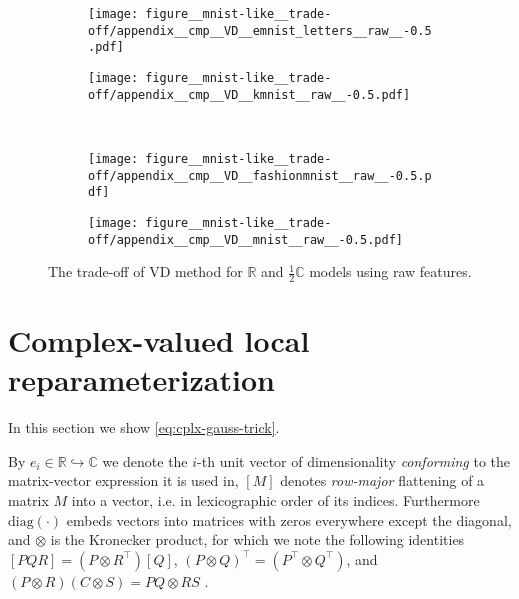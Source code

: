 \documentclass{article}
\newcommand{\real}{\mathbb{R}}
\newcommand{\cplx}{\mathbb{C}}
\newcommand{\diag}[1]{\mathrm{diag}{#1}}
\begin{document}
\begin{figure}[b]
  \centering
  \begin{subfigure}  %
    \centering
    \texttt{[image: figure\_\_mnist-like\_\_trade-off/appendix\_\_cmp\_\_VD\_\_emnist\_letters\_\_raw\_\_-0.5.pdf]}
  \end{subfigure}%
  \begin{subfigure}  %
    \centering
    \texttt{[image: figure\_\_mnist-like\_\_trade-off/appendix\_\_cmp\_\_VD\_\_kmnist\_\_raw\_\_-0.5.pdf]}
  \end{subfigure} \\%
  \begin{subfigure}  %
    \centering
    \texttt{[image: figure\_\_mnist-like\_\_trade-off/appendix\_\_cmp\_\_VD\_\_fashionmnist\_\_raw\_\_-0.5.pdf]}
  \end{subfigure}%
  \begin{subfigure}  %
    \centering
    \texttt{[image: figure\_\_mnist-like\_\_trade-off/appendix\_\_cmp\_\_VD\_\_mnist\_\_raw\_\_-0.5.pdf]}
  \end{subfigure}
  \caption{%
    The trade-off of VD method for $\real$ and $\tfrac12\cplx$ models using raw features.
  }
  \label{fig:appendix__cmp__mnist-like__trade-off__VD__raw}
\end{figure}



\section{Complex-valued local reparameterization} %
\label{sec:complex_valued_local_reparameterization}

In this section we show \eqref{eq:cplx-gauss-trick}.

By $e_i\in \real \hookrightarrow \cplx$ we denote the $i$-th unit vector of dimensionality
\emph{conforming} to the matrix-vector expression it is used in, $[M]$ denotes \emph{row-major}
flattening of a matrix $M$ into a vector, i.e. in lexicographic order of its indices.
Furthermore $\diag{(\cdot)}$ embeds vectors into matrices with zeros everywhere except
the diagonal, and $\otimes$ is the Kronecker product, for which we note the following
identities $
  [P Q R] = (P \otimes R^\top) [Q]
$, $
  (P \otimes Q)^\top = (P^\top \otimes Q^\top)
$, and $
  (P \otimes R) (C \otimes S) = P Q \otimes R S
$ \citep{petersen_matrix_2012}.
\end{document}
